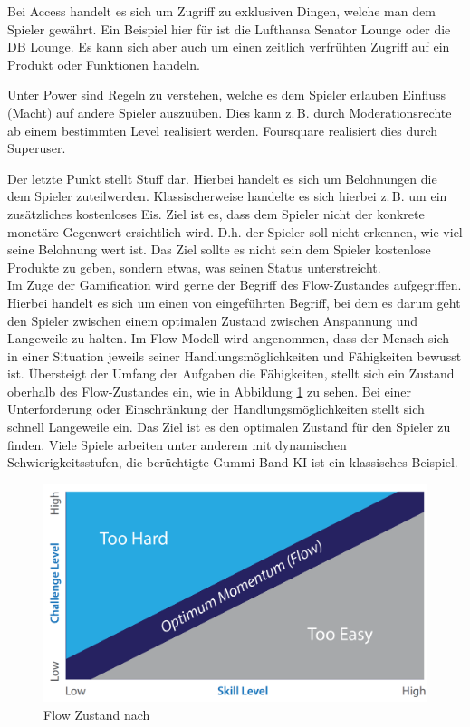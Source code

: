 Bei Access handelt es sich um \glqq Zugriff\grqq{} zu exklusiven Dingen, welche man dem Spieler gewährt. Ein Beispiel hier für ist die Lufthansa Senator Lounge oder die DB Lounge.
Es kann sich aber auch um einen zeitlich verfrühten Zugriff auf ein Produkt oder Funktionen handeln.

Unter Power sind Regeln zu verstehen, welche es dem Spieler erlauben Einfluss (Macht) auf andere Spieler auszuüben. Dies kann z.\,B. durch Moderationsrechte ab einem bestimmten Level realisiert werden. Foursquare realisiert dies durch Superuser.\cite{Lindqvist.2011}

Der letzte Punkt stellt Stuff dar. Hierbei handelt es sich um Belohnungen die dem Spieler zuteilwerden. Klassischerweise handelte es sich hierbei z.\,B. um ein zusätzliches kostenloses Eis. Ziel ist es, dass dem Spieler nicht der konkrete monetäre Gegenwert ersichtlich wird. D.h. der Spieler soll nicht erkennen, wie viel seine Belohnung wert ist. Das Ziel sollte es nicht sein dem Spieler kostenlose Produkte zu geben, sondern etwas, was seinen Status unterstreicht.\\

Im Zuge der Gamification wird gerne der Begriff des Flow-Zustandes aufgegriffen.
Hierbei handelt es sich um einen von \textcite{Csikszentmihalyi.1991} eingeführten Begriff, bei dem es darum geht den Spieler zwischen einem optimalen Zustand zwischen Anspannung und Langeweile zu halten. Im Flow Modell wird angenommen, dass der Mensch sich in einer Situation jeweils seiner Handlungsmöglichkeiten und Fähigkeiten bewusst ist.
Übersteigt der Umfang der Aufgaben die Fähigkeiten, stellt sich ein Zustand oberhalb des Flow-Zustandes ein, wie in Abbildung \ref{img:ch03_img02_flow} zu sehen. Bei einer Unterforderung oder Einschränkung der Handlungsmöglichkeiten stellt sich schnell Langeweile ein. Das Ziel ist es den optimalen Zustand für den Spieler zu finden. Viele Spiele arbeiten unter anderem mit dynamischen Schwierigkeitsstufen, die berüchtigte Gummi-Band KI ist ein klassisches Beispiel.\cite{Bateman.2011}

\begin{figure}[H]
\begin{center}
\includegraphics[width=120mm]{images/ch03_img02_flow.png}
\caption{Flow Zustand nach \textcite{Csikszentmihalyi.1991}}
\label{img:ch03_img02_flow}
\end{center}
\end{figure}


